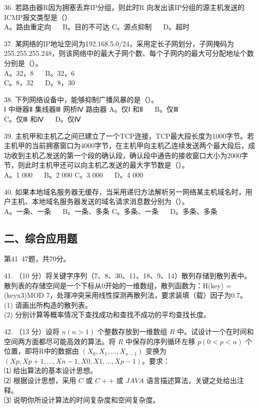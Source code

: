 36. 若路由器R因为拥塞丢弃IP分组，则此时R 向发出该IP分组的源主机发送的ICMP报文类型是（） \\
A。路由重定向 $\quad$ B。目的不可达
C。源点抑制 $\quad$ D。超时

37. 某网络的IP地址空间为192.168.5.0/24，采用定长子网划分，子网掩码为255.255.255.248，则该网络中的最大子网个数、每个子网内的最大可分配地址个数分别是（）。  \\
A。32，8 $\quad$ B。32，6 \\
C。8，32 $\quad$ D。8，30

38. 下列网络设备中，能够抑制广播风暴的是（）。 \\
Ⅰ 中继器Ⅱ 集线器Ⅲ 网桥Ⅳ 路由器
A。仅Ⅰ 和Ⅱ $\quad$ B。仅Ⅲ \\
C。仅Ⅲ 和Ⅳ $\quad$ D。仅Ⅳ

39. 主机甲和主机乙之间已建立了一个TCP连接，TCP最大段长度为1000字节。若主机甲的当前拥塞窗口为4000字节，在主机甲向主机乙连续发送两个最大段后，成功收到主机乙发送的第一个段的确认段，确认段中通告的接收窗口大小为2000字节，则此时主机甲还可以向主机乙发送的最大字节数是（）。 \\
A。1 000 $\quad$ B。2 000
C。3 000 $\quad$ D。4 000

40. 如果本地域名服务器无缓存，当采用递归方法解析另一网络某主机域名时，用户主机、本地域名服务器发送的域名请求消息数分别为（）。 \\
A。一条、一条 $\quad$ B。一条、多条
C。多条、一条 $\quad$ D。多条、多条

\subsection{二、综合应用题}
第41~47题，共70分。

41. （10 分）将关键字序列（7、8、30、11、18、9、14）散列存储到散列表中。散列表的存储空间是一个下标从0开始的一维数组，散列函数为：H(key) = (keyx3)MOD 7，处理冲突采用线性探测再散列法，要求装填（载）因子为0.7。 \\
(1) 请画出所构造的散列表。  \\
(2) 分别计算等概率情况下查找成功和查找不成功的平均查找长度。

42. （13 分）设将 $n(n>1)$ 个整数存放到一维数组 $R$ 中。试设计一个在时间和空间两方面都尽可能高效的算法。将 $R$ 中保存的序列循环左移 $p(0<p<n)$ 个位置，即将R中的数据由 $(X_0, X_1, ..., X_{n-1})$ 变换为 $(Xp,Xp+1, ..., Xn-1, X0, X1, ..., Xp-1)$。要求：  \\
⑴ 给出算法的基本设计思想。  \\
⑵ 根据设计思想，采用 $C$ 或 $C++$ 或 $JAVA$ 语言描述算法，关键之处给出注释。  \\
⑶ 说明你所设计算法的时间复杂度和空间复杂度。

